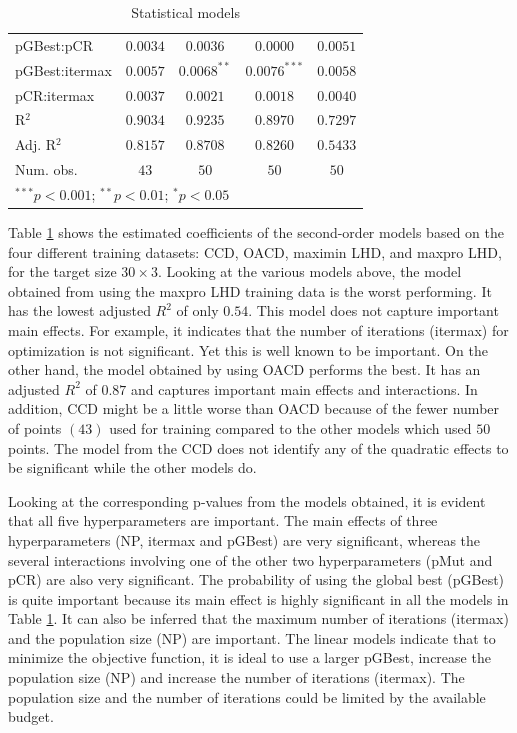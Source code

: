 \documentclass [PhD] {package/uclathes}
\begin{document}
\begin{table}
\begin{center}
\begin{tabular}{l c c c c}
pGBest:pCR     & $0.0034$        & $0.0036$        & $0.0000$        & $0.0051$        \\
pGBest:itermax & $0.0057$        & $0.0068^{**}$   & $0.0076^{***}$  & $0.0058$        \\
pCR:itermax    & $0.0037$        & $0.0021$        & $0.0018$        & $0.0040$        \\
\hline
R$^2$          & $0.9034$        & $0.9235$        & $0.8970$        & $0.7297$        \\
Adj. R$^2$     & $0.8157$        & $0.8708$        & $0.8260$        & $0.5433$        \\
Num. obs.      & $43$            & $50$            & $50$            & $50$            \\
\hline
\multicolumn{5}{l}{\scriptsize{$^{***}p<0.001$; $^{**}p<0.01$; $^{*}p<0.05$}}
\end{tabular}
\caption{Statistical models}
\label{table:coefficients}
\end{center}
\end{table}
Table \ref{table:coefficients} shows the estimated coefficients of the second-order models based on the four different training datasets: CCD, OACD, maximin LHD, and maxpro LHD, for the target size $30 \times 3$.
Looking at the various models above, the model obtained from using the maxpro LHD  training data is the worst performing. It has the lowest adjusted $R^2$ of only $0.54$. This model does not capture important main effects. For example, it indicates that the number of iterations (itermax) for optimization is not significant. Yet this is well known to be {important}. On the other hand, the model obtained by using OACD performs the best. It has an adjusted $R^2$ of $0.87$ and captures important main effects and interactions. In addition, CCD might be a little worse than OACD because of the fewer number of points $(43)$ used for training compared to the other models which used $50$ points.
The model from the CCD does not identify any of the quadratic effects to be significant while the other models do.

Looking at the corresponding p-values from the models obtained, it is evident that all five hyperparameters are important. The main effects of three hyperparameters (NP, itermax and pGBest) are very significant, whereas the several interactions involving one of the other two hyperparameters (pMut and pCR) are also very significant.
The probability of using the global best (pGBest) is quite important because its main effect  is highly significant in all the models in Table \ref{table:coefficients}. It can also be inferred that the maximum number of iterations (itermax) and the population size (NP) are important. The linear models indicate that to minimize the objective function, it is ideal to use a larger pGBest, increase the population size (NP) and  increase the number of iterations (itermax). The population size and the number of iterations could be limited by the available budget.
\end{document}
